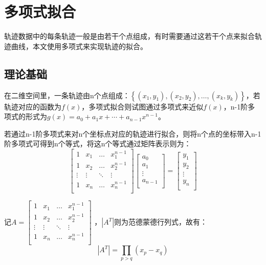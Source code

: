 \section{多项式拟合}
轨迹数据中的每条轨迹一般是由若干个点组成，有时需要通过这若干个点来拟合轨迹曲线，本文使用多项式来实现轨迹的拟合。
\subsection{理论基础}
在二维空间里，一条轨迹由n个点组成：$\left\{\left(x_{1}, y_{1}\right),\left(x_{2}, y_{2}\right), \dots,\left(x_{k}, y_{k}\right)\right\}$，若轨迹对应的函数为$f(x)$，多项式拟合则试图通过多项式来近似$f(x)$，n-1阶多项式的形式为$g\left( x \right) =a_0+a_1x+\cdots +a_{n-1}x^{n-1}$。

若通过n-1阶多项式来对n个坐标点对应的轨迹进行拟合，则将n个点的坐标带入n-1阶多项式可得到n个等式，将这n个等式通过矩阵表示则为：
\begin{equation}
\label{vandermonde}
\left[ \begin{matrix}
	1&		x_1&		\dots&		x_{1}^{n-1}\\
	1&		x_2&		\dots&		x_{2}^{n-1}\\
	\vdots&		\vdots&		\ddots&		\vdots\\
	1&		x_n&		\dots&		x_{n}^{n-1}\\
\end{matrix} \right] \left[ \begin{array}{c}
	a_0\\
	a_1\\
	\vdots\\
	a_{n-1}\\
\end{array} \right] =\left[ \begin{array}{c}
	y_1\\
	y_2\\
	\vdots\\
	y_n\\
\end{array} \right] 
\end{equation}

记$A=\left[ \begin{matrix}
	1&		x_1&		\dots&		x_{1}^{n-1}\\
	1&		x_2&		\dots&		x_{2}^{n-1}\\
	\vdots&		\vdots&		\ddots&		\vdots\\
	1&		x_n&		\dots&		x_{n}^{n-1}\\
\end{matrix} \right] $
，$\left|A^{T}\right|$则为范德蒙德行列式，故有：
\begin{equation}
\left|A^{T}\right|=\prod_{p>q}\left(x_{p}-x_{q}\right)
\end{equation}

